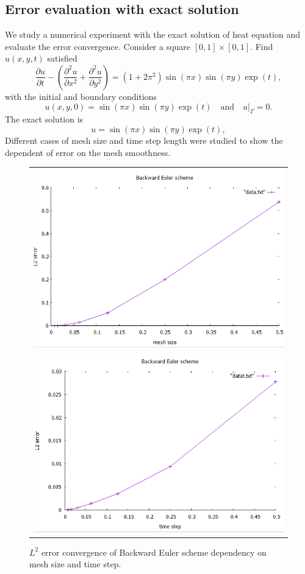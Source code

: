 \subsection{Error evaluation with exact solution}
We study a numerical experiment with the exact solution of heat equation and evaluate the error convergence. Consider a square $[0,1]\times[0,1]$. Find $u(x,y,t)$ satisfied
\begin{equation}
\dfrac{\partial u}{\partial t} - \left(\dfrac{\partial^2 u}{\partial x^2} + \dfrac{\partial^2u}{\partial y^2}\right) = (1+2\pi^2)\sin(\pi x) \sin(\pi y)\exp(t),
\end{equation}
with the initial and boundary conditions
$$
u(x,y,0) = \sin(\pi x)\sin(\pi y)\exp(t) \quad \text{and} \quad u|_\Gamma = 0.
$$
The exact solution is
$$
u = \sin(\pi x) \sin(\pi y) \exp(t),
$$
Different cases of mesh size and time step length were studied to show the dependent of error on the mesh smoothness.
\begin{figure}[h!]
	\centering
	\begin{tabular}{c}
		\includegraphics[width=.8\linewidth]{figures/BE} \\ \includegraphics[width=.8\linewidth]{figures/BEt}
	\end{tabular}
	\caption{$L^2$ error convergence of Backward Euler scheme dependency on mesh size and time step.}
\end{figure}
